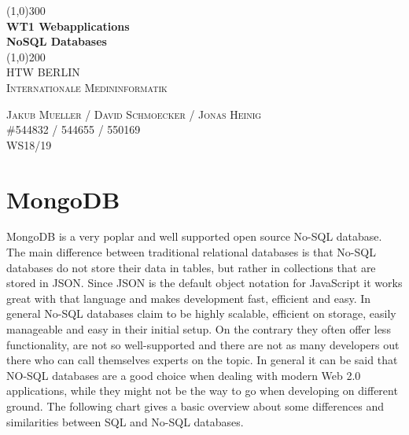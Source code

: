 \documentclass[11pt]{article}
\begin{document}
\begin{titlepage} 
	\begin{center}
	\line(1,0){300} \\
	[4mm]
	\huge{\bfseries WT1 Webapplications \\ NoSQL Databases} \\
	[2mm]
	\line(1,0){200}\\	
	[1.5cm]
	\textsc{\LARGE HTW BERLIN}\\
	[0.75cm]
	\textsc{\LARGE Internationale Medininformatik} \\  
	[9cm]
	\end{center}	 
	\begin{flushright}
		\textsc{\large Jakub Mueller / David Schmoecker / Jonas Heinig \\
		\#544832 / 544655 / 550169 \\
		WS18/19\\}
	\end{flushright} 
	 
	
	
\end{titlepage}  
 

\tableofcontents
  
\cleardoublepage %




\setcounter{page}{1} %





\section{MongoDB} 
MongoDB is a very poplar and well supported open source No-SQL database. The main difference between traditional relational databases is that No-SQL databases do not store their data in tables, but rather in collections that are stored in JSON. Since JSON is the default object notation for JavaScript it works great with that language and makes development fast, efficient and easy. In general No-SQL databases claim to be highly scalable, efficient on storage, easily manageable and easy in their initial setup. On the contrary they often offer less functionality, are not so well-supported and there are not as many developers out there who can call themselves experts on the topic. 
	In general it can be said that NO-SQL databases are a good choice when dealing with modern Web 2.0 applications, while they might not be the way to go when developing on different ground. \cite{nosqladvantages} The following chart gives a basic overview about some differences and similarities between SQL and No-SQL databases. 
	
\end{document}
